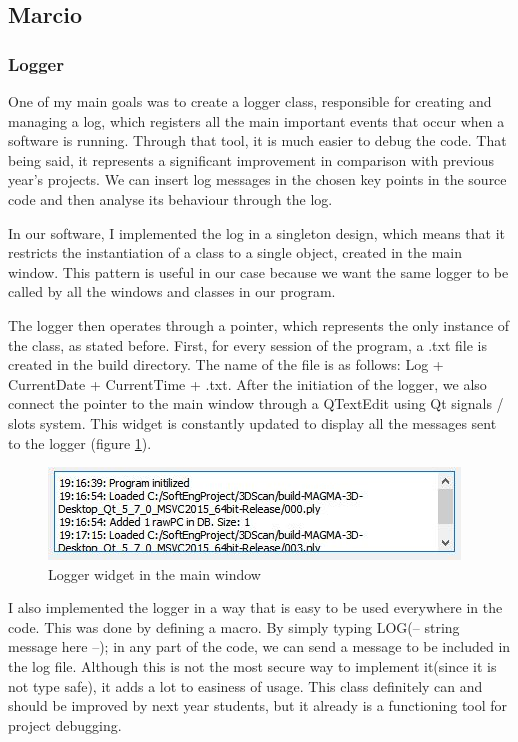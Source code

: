 \documentclass[aps,letterpaper,11pt]{revtex4}
\begin{document}
\subsection{Marcio}

\subsubsection{Logger}
One of my main goals was to create a logger class, responsible for creating and managing a log, which registers all the main important events that occur when a software is running. Through that tool, it is much easier to debug the code. That being said, it represents a significant improvement in comparison with previous year's projects. We can insert log messages in the chosen key points in the source code and then analyse its behaviour through the log.\par
In our software, I implemented the log in a singleton design, which means that it restricts the instantiation of a class to a single object, created in the main window. This pattern is useful in our case because we want the same logger to be called by all the windows and classes in our program.\par
The logger then operates through a pointer, which represents the only instance of the class, as stated before. First, for every session of the program, a .txt file is created in the build directory. The name of the file is as follows: Log + CurrentDate + CurrentTime + .txt. After the initiation of the logger, we also connect the pointer to the main window through a QTextEdit using Qt signals / slots system. This widget is constantly updated to display all the messages sent to the logger (figure \ref{fig:logger}).\par
\begin{figure}[h]
\includegraphics[scale=1]{logger_mw}
\caption{Logger widget in the main window}
\label{fig:logger}
\end{figure}

I also implemented the logger in a way that is easy to be used everywhere in the code. This was done by defining a macro. By simply typing LOG(-- string message here --); in any part of the code, we can send a message to be included in the log file. Although this is not the most secure way to implement it(since it is not type safe), it adds a lot to easiness of usage. This class definitely can and should be improved by next year students, but it already is a functioning tool for project debugging.\par
\end{document}
